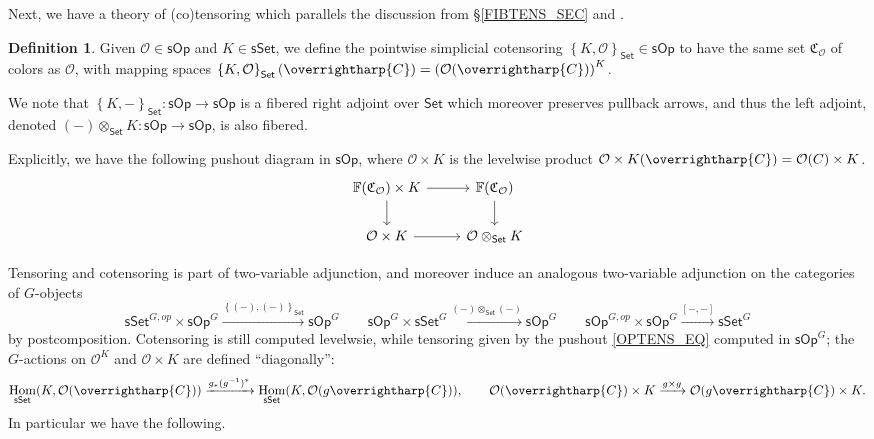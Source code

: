 \documentclass[a4paper,10pt
,draft
]{article}%
\numberwithin{equation}{section}
\numberwithin{figure}{section}
\theoremstyle{definition} %
\newtheorem{definition}[equation]{Definition}%
\newcommand{\set}[1]{\left\{#1\right\}}%
\newcommand{\vect}[1]{\text{\overrightharp{\ensuremath{#1}}}}
\newcommand{\Set}{\ensuremath{\mathsf{Set}}}
\newcommand{\sSet}{\ensuremath{\mathsf{sSet}}}%
\newcommand{\sOp}{\ensuremath{\mathsf{sOp}}}%
\DeclareMathOperator{\Hom}{Hom}%
\renewcommand{\O}{\ensuremath{\mathcal O}}
\newcommand{\1}{\ensuremath{\mathbbm 1}}%
\begin{document}

Next, we have a theory of (co)tensoring which parallels the discussion from \S \ref{FIBTENS_SEC} and \cite[Remark 4.13]{BP_HGOP}.
\begin{definition}
      \label{COTENS_DEF}
      Given $\O \in \sOp$ and $K \in \sSet$, we define the pointwise simplicial cotensoring
      \( \set{K,\O}_\Set \in \sOp \) to have the same set $\mathfrak C_\O$ of colors as $\O$, with mapping spaces
      \( \set{K, \O}_\Set (\vect C) = \left( \O(\vect C) \right)^K \). 

      We note that $\set{K,-}_\Set \colon \sOp \to \sOp$ is a fibered right adjoint over $\Set$ which moreover preserves pullback arrows,
      and thus the left adjoint, denoted $(-) \otimes_\Set K \colon \sOp \to \sOp$, is also fibered.
\end{definition}
Explicitly, we have the following pushout diagram in $\sOp$, where $\O \times K$ is the levelwise product $\O \times K(\vect C) = \O(C) \times K$.
\begin{equation}
      \label{OPTENS_EQ}
      \begin{tikzcd}
            \mathbb F(\mathfrak C_\O) \times K \arrow[d] \arrow[r]
            &
            \mathbb F(\mathfrak C_\O) \arrow[d]
            \\
            \O \times K \arrow[r]
            &
            \O \otimes_\Set K
      \end{tikzcd}
\end{equation}

Tensoring and cotensoring is part of two-variable adjunction,
and moreover induce an analogous two-variable adjunction on the categories of $G$-objects 
\[
      \sSet^{G,op} \times \sOp^G \xrightarrow{\set{(-),(-)}_\Set} \sOp^G
      \qquad
      \sOp^G \times \sSet^G \xrightarrow{(-) \otimes_\Set (-)} \sOp^G
      \qquad
      \sOp^{G,op} \times \sOp^G \xrightarrow{[-,-]} \sSet^G
\]
by postcomposition.
Cotensoring is still computed levelwsie, while tensoring given by the pushout \eqref{OPTENS_EQ} computed in $\sOp^G$;
the $G$-actions on $\O^K$ and $\O \times K$ are defined ``diagonally'':
\begin{equation}
      \label{DIAGTENS_EQ}
      \Hom_{\sSet}(K,\O(\vect C)) \xrightarrow{g_{\**}(g^{-1})^{\**}} \Hom_{\sSet}(K, \O(g \vect C)),
      \qquad
      \O(\vect C) \times K \xrightarrow{g \times g} \O(g \vect C) \times K.
\end{equation}
In particular we have the following.
\end{document}
